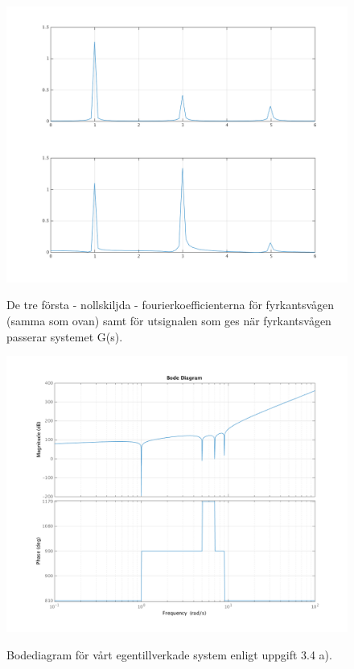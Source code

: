 \begin{figure}
    \caption{De tre första - nollskiljda - fourierkoefficienterna för
    fyrkantsvågen (samma som ovan) samt för utsignalen som ges när
    fyrkantsvågen passerar systemet G(s).}
    \centering
    \includegraphics[scale=0.55]{figures/task3d+fk.png}
    \label{fig:task3d+fk}
\end{figure}

\begin{figure}
    \caption{Bodediagram för vårt egentillverkade system enligt uppgift 3.4 a).}
    \centering
    \includegraphics[scale=0.55]{figures/task4a-bode.png}
    \label{fig:task4a-bode}
\end{figure}

